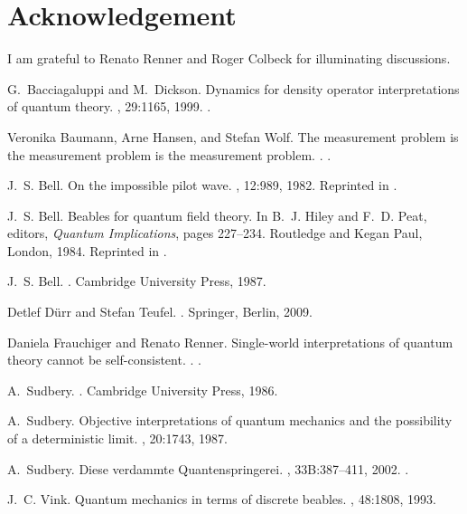\documentclass[12pt,reqno]{article}
\renewcommand{\(}{\left(}
\renewcommand{\)}{\right)}
\renewcommand{\.}{\centerdot}
\newcommand{\1}{\mathbf{1}}
\newcommand{\<}{\langle}
\renewcommand{\>}{\rangle}
\theoremstyle{definition}
\theoremstyle{remark}
\numberwithin{equation}{section}
\begin{document}
\section*{Acknowledgement}

I am grateful to Renato Renner and Roger Colbeck for illuminating discussions.

%
%

\begin{thebibliography}{10}

G.~Bacciagaluppi and M.~Dickson.
\newblock Dynamics for density operator interpretations of quantum theory.
, 29:1165, 1999.
.

Veronika Baumann, Arne Hansen, and Stefan Wolf.
\newblock The measurement problem is the measurement problem is the measurement
  problem.
.
.

J.~S. Bell.
\newblock On the impossible pilot wave.
, 12:989, 1982.
\newblock Reprinted in \cite{Bell:book}.

J.~S. Bell.
\newblock Beables for quantum field theory.
\newblock In B.~J. Hiley and F.~D. Peat, editors, {\em Quantum Implications},
  pages 227--234. Routledge and Kegan Paul, London, 1984.
\newblock Reprinted in \cite{Bell:book}.

J.~S. Bell.
.
\newblock Cambridge University Press, 1987.

Detlef D{\"u}rr and Stefan Teufel.
.
\newblock Springer, Berlin, 2009.

Daniela Frauchiger and Renato Renner.
\newblock Single-world interpretations of quantum theory cannot be
  self-consistent.
.
.

A.~Sudbery.
.
\newblock Cambridge University Press, 1986.

A.~Sudbery.
\newblock Objective interpretations of quantum mechanics and the possibility of
  a deterministic limit.
, 20:1743, 1987.

A.~Sudbery.
\newblock Diese verdammte {Q}uantenspringerei.
, 33B:387--411, 2002.
.

J.~C. Vink.
\newblock Quantum mechanics in terms of discrete beables.
, 48:1808, 1993.

\end{thebibliography}
\end{document}

